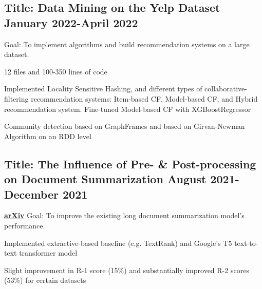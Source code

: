 \documentclass[11pt]{article}
\begin{document}
\vspace{0.1in}

\subsection*{Title: Data Mining on the Yelp Dataset \hfill {\normalfont January 2022-April 2022}}
\noindent
Goal: To implement algorithms and build recommendation systems on a large dataset.
\begin{compactitem}
	\item 12 files and 100-350 lines of code
	\item Implemented Locality Sensitive Hashing, and different types of collaborative-filtering recommendation systems: Item-based CF, Model-based CF, and Hybrid recommendation system. Fine-tuned Model-based CF with XGBoostRegressor
	\item Community detection based on GraphFrames and based on Girvan-Newman Algorithm on an RDD level
\end{compactitem}

\subsection*{Title: The Influence of Pre- \& Post-processing on Document Summarization \hfill {\normalfont August
        2021-December 2021}}
\noindent
\href{https://github.com/Anthonyive/csci-544-project.git}{}  \href{https://www.youtube.com/watch?v=oVIVtOPeWEs}{} \href{https://arxiv.org/abs/2112.01660}{\textbf{arXiv}} Goal: To improve the existing long document summarization model's performance.
\begin{compactitem}
    \item Implemented extractive-based baseline (e.g. TextRank) and Google's T5 text-to-text transformer model
    \item Slight improvement in R-1 score (15\%) and substantially improved R-2 scores (53\%) for certain datasets
\end{compactitem}
\end{document}

